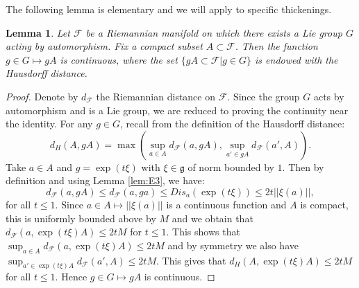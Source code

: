 \documentclass[12pt]{amsbook}%
\newtheorem{lem}[thm]{Lemma}
\theoremstyle{definition}
\theoremstyle{remark}
\numberwithin{section}{chapter}
\numberwithin{subsection}{section}
\numberwithin{figure}{chapter}
\def\cF{{\mathscr{F}}}
\begin{document}
{{The following lemma is elementary and we will apply to specific thickenings.
\begin{lem} \label{lem_continuity_hausdorff}  Let $\cF$ be a Riemannian manifold  on which there exists a Lie group $G$ acting by automorphism. 
Fix a compact subset $A \subset \cF$.  Then the function $g \in G \mapsto gA$ is continuous, where the set  $\{ gA \subset \cF | g \in G\}$ is endowed with the Hausdorff distance.
\end{lem}

\begin{proof}
Denote by $d_{\cF}$ the Riemannian distance on $\cF$. Since the group $G$ acts by automorphism and is a Lie group, we are reduced to proving the continuity near the identity.
For any $g \in G$, recall from \cite[Definition 1.5.1]{krantz_parks} the definition of the Hausdorff distance: 
\begin{equation*}
d_H(A,gA) = \max (\sup_{a \in A} d_{\cF}(a, gA), \sup_{a' \in gA} d_{\cF}(a', A)).
\end{equation*} 
Take $a \in A$ and  $g = \exp(t \xi)$ with $\xi \in \mathfrak{g}$ of norm bounded by $1$. Then by definition and using Lemma \ref{lem:E3}, we have: 
\begin{equation*}
d_{\cF}(a, g A) \leqslant d_{\cF}( a , g a ) \leqslant Dis_a(\exp(t \xi)) \leqslant 2 t  ||\xi(a) ||, 
\end{equation*}
for all $t \leqslant 1$. 
Since $a \in A \mapsto || \xi(a)||$ is a continuous function and $A$ is compact, this is uniformly bounded above by $M$ and we obtain that $d_{\cF}(a, \exp(t \xi )A) \leqslant 2 t M$ for $t \leqslant 1$. 
This shows that $\sup_{a\in A} d_{\cF}(a , \exp(t\xi)A) \leqslant 2 t M$ and by symmetry we also have $\sup_{a'\in \exp(t\xi) A} d_{\cF}(a', A) \leqslant 2 t M$. 
This gives that $d_H(A, \exp(t \xi) A) \leqslant 2 t M$ for all $t \leqslant 1$. Hence $g \in G \mapsto gA$ is continuous.  
\end{proof}

  

}}
\end{document}
